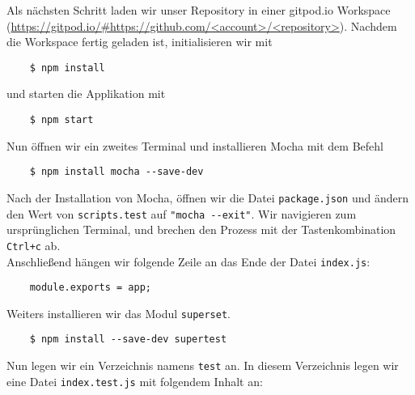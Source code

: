\noindent
Als nächsten Schritt laden wir unser Repository in einer gitpod.io Workspace
(\url{https://gitpod.io/#https://github.com/<account>/<repository>}).
Nachdem die Workspace fertig geladen ist, initialisieren wir mit 

\begin{verbatim}
	$ npm install
\end{verbatim}

\noindent
und starten die Applikation mit 
\begin{verbatim}
	$ npm start
\end{verbatim}

\noindent
Nun öffnen wir ein zweites Terminal und installieren Mocha
\cite{mochajsorgWebsite} mit dem Befehl

\begin{verbatim}
	$ npm install mocha --save-dev
\end{verbatim}

\noindent
Nach der Installation von Mocha, öffnen wir die Datei \verb|package.json|
und ändern den Wert von \verb|scripts.test| auf \verb|"mocha --exit"|.
Wir navigieren zum ursprünglichen Terminal, und brechen den Prozess mit der
Tastenkombination \verb|Ctrl+c| ab. \\

\noindent
Anschließend hängen wir folgende Zeile an das Ende der Datei \verb|index.js|:

\begin{verbatim}
	module.exports = app;
\end{verbatim}

\noindent
Weiters installieren wir das Modul \verb|superset|.

\begin{verbatim}
	$ npm install --save-dev supertest
\end{verbatim}

\noindent
Nun legen wir ein Verzeichnis namens \verb|test| an.
In diesem Verzeichnis legen wir eine Datei \verb|index.test.js| 
mit folgendem Inhalt an:

